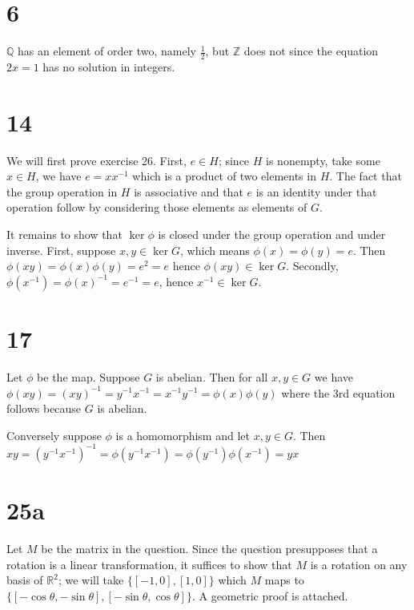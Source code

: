 \documentclass{article}
\def\Z{\mathbb{Z}}
\def\R{\mathbb{R}}
\def\Q{\mathbb{Q}}
\def\inv{{-1}}
\begin{document}
\section*{6}

$\Q$ has an element of order two, namely $\frac{1}{2}$, but $\Z$ does not since the equation $2x = 1$ has no solution in integers.

\section*{14}

We will first prove exercise 26. First, $e \in H$; since $H$ is nonempty, take some $x \in H$, we have $e = x x^\inv$ which is a product of two elements in $H$. The fact that the group operation in $H$ is associative and that $e$ is an identity under that operation follow by considering those elements as elements of $G$.

It remains to show that $\ker \phi$ is closed under the group operation and under inverse. First, suppose $x, y \in \ker G$, which means $\phi(x) = \phi(y) = e$. Then $\phi(xy) = \phi(x) \phi(y) = e^2 = e$ hence $\phi(xy) \in \ker G$. Secondly, $\phi(x^\inv) = \phi(x)^\inv = e^\inv = e$, hence $x^\inv \in \ker G$.

\section*{17}

Let $\phi$ be the map. Suppose $G$ is abelian. Then for all $x, y \in G$ we have $\phi(xy) = (xy)^\inv = y^\inv x^\inv = x^\inv y^\inv = \phi(x) \phi(y)$ where the 3rd equation follows because $G$ is abelian.

Conversely suppose $\phi$ is a homomorphism and let $x, y \in G$. Then $xy = (y^\inv x^\inv)^\inv = \phi(y^\inv x^\inv) = \phi(y^\inv) \phi(x^\inv) = yx$

\section*{25a}

Let $M$ be the matrix in the question. Since the question presupposes that a rotation is a linear transformation, it suffices to show that $M$ is a rotation on any basis of $\R^2$; we will take $\{[-1, 0], [1, 0]\}$ which $M$ maps to $\{[-\cos\theta, -\sin\theta], [-\sin\theta, \cos\theta]\}$. A geometric proof is attached.
\end{document}
